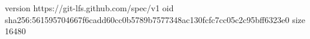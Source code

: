 version https://git-lfs.github.com/spec/v1
oid sha256:561595704667f6cadd60cc0b5789b7577348ac130fcfc7cc05c2c95bff6323e0
size 16480

